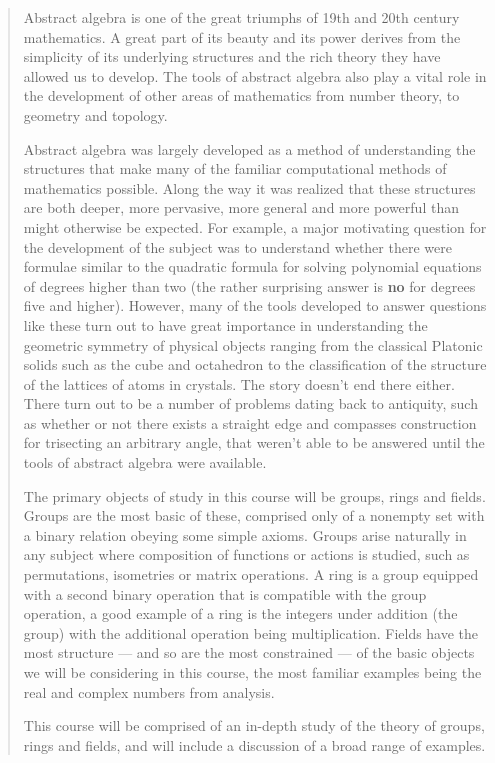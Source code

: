 \documentclass[12pt]{article}
\renewcommand{\emph}[1]{\textsf{\textbf{#1}}}
\begin{document}
\begin{quote}
Abstract algebra is one of the great triumphs of 19th and 20th century mathematics. A great part of its beauty and its power derives from the simplicity of its underlying structures and the rich theory they have allowed us to develop. The tools of abstract algebra also play a vital role in the development of other areas of mathematics from number theory, to geometry and topology.

Abstract algebra was largely developed as a method of understanding the structures that make many of the familiar computational methods of mathematics possible. Along the way it was realized that these structures are both deeper, more pervasive, more general and more powerful than might otherwise be expected. For example, a major motivating question for the development of the subject was to understand whether there were formulae similar to the quadratic formula for solving polynomial equations of degrees higher than two (the rather surprising answer is \emph{no} for degrees five and higher). However, many of the tools developed to answer questions like these turn out to have great importance in understanding the geometric symmetry of physical objects ranging from the classical Platonic solids such as the cube and octahedron to the classification of the structure of the lattices of atoms in crystals. The story doesn't end there either. There turn out to be a number of problems dating back to antiquity, such as whether or not there exists a straight edge and compasses construction for trisecting an arbitrary angle, that weren't able to be answered until the tools of abstract algebra were available.

The primary objects of study in this course will be groups, rings and fields. Groups are the most basic of these, comprised only of a nonempty set with a binary relation obeying some simple axioms. Groups arise naturally in any subject where composition of functions or actions is studied, such as permutations, isometries or matrix operations. A ring is a group equipped with a second binary operation that is compatible with the group operation, a good example of a ring is the integers under addition (the group) with the additional operation being multiplication. Fields have the most structure --- and so are the most constrained --- of the basic objects we will be considering in this course, the most familiar examples being the real and complex numbers from analysis.

This course will be comprised of an in-depth study of the theory of groups, rings and fields, and will include a discussion of a broad range of examples.
\end{quote}
\end{document}
